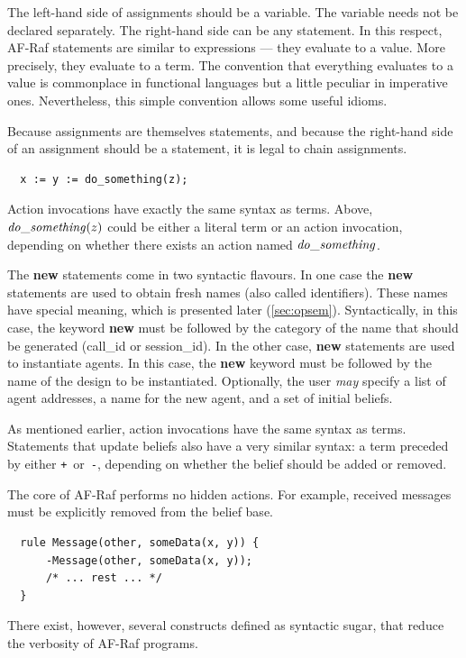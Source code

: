 \documentclass[a4paper,12pt,oneside,fleqn]{book} %
\begin{document}
{The left-hand side of assignments should be a variable. The variable needs
not be declared separately.  The right-hand side can be any statement.  In
this respect, AF-Raf statements are similar to expressions --- they
evaluate to a value. More precisely, they evaluate to a term. The
convention that everything evaluates to a value is commonplace in
functional languages but a little peculiar in imperative ones.
Nevertheless, this simple convention allows some useful idioms.

\begin{example}
Because assignments are themselves statements, and because the right-hand
side of an assignment should be a statement, it is legal to chain
assignments.
\begin{verbatim}
  x := y := do_something(z);
\end{verbatim}
Action invocations have exactly the same syntax as terms. Above, ${\it
do\_something}(z)$ could be either a literal term or an action invocation,
depending on whether there exists an action named ${\it do\_something}$.
\end{example}

The {\bf new} statements come in two syntactic flavours. In one case the
{\bf new} statements are used to obtain fresh names (also called
identifiers). These names have special meaning, which is presented later
(\autoref{sec:opsem}). Syntactically, in this case, the keyword {\bf new}
must be followed by the category of the name that should be generated
(call\_id or session\_id). In the other case, {\bf new} statements are used
to instantiate agents. In this case, the {\bf new} keyword must be followed
by the name of the design to be instantiated.  Optionally, the user
\emph{may} specify a list of agent addresses, a name for the new agent, and
a set of initial beliefs.

As mentioned earlier, action invocations have the same syntax as terms.
Statements that update beliefs also have a very similar syntax: a term
preceded by either \verb-+-~or~\verb+-+, depending on whether the belief
should be added or removed.

\begin{example}
The core of AF-Raf performs no hidden actions. For example, received
messages must be explicitly removed from the belief base.
\begin{verbatim}
  rule Message(other, someData(x, y)) {
      -Message(other, someData(x, y));
      /* ... rest ... */
  }
\end{verbatim}
There exist, however, several constructs defined as syntactic sugar, that
reduce the verbosity of AF-Raf programs.
\end{example}

}
\end{document}
